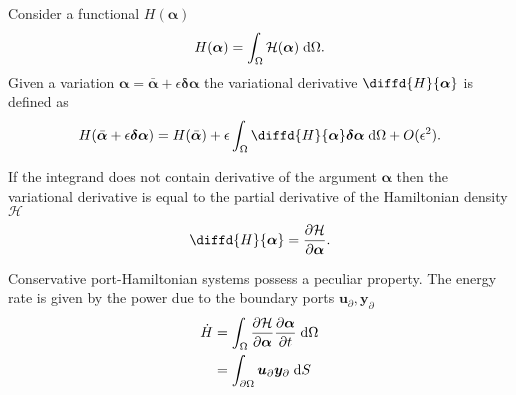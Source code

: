 \begin{definition}
Consider a functional $H(\bm{\alpha})$
\[ H(\bm{\alpha}) = \int_{\Omega} \mathcal{H}(\bm{\alpha}) \d{\Omega}.
\]
Given a variation $\bm{\alpha} = \bar{\bm{\alpha}} + \epsilon \bm{\delta\alpha}$ the variational derivative $\diffd{H}{\bm{\alpha}}$ is defined as
\[
H(\bar{\bm{\alpha}} + \epsilon \bm{\delta\alpha}) = H(\bar{\bm{\alpha}}) + \epsilon \int_{\Omega} \diffd{H}{\bm{\alpha}} \bm{\delta\alpha} \d{\Omega} + O(\epsilon^2).
\]
\end{definition}
\begin{remark}
If the integrand does not contain derivative of the argument $\bm{\alpha}$ then the variational derivative is equal to the partial derivative of the Hamiltonian density $\mathcal{H}$
\[
\diffd{H}{\bm{\alpha}} = \diffp{\mathcal{H}}{\bm{\alpha}}.
\]
\end{remark}
Conservative port-Hamiltonian systems possess a peculiar property. The energy rate is given by the power due to the boundary ports $\bm{u}_\partial, \bm{y}_\partial$
\begin{equation}
\begin{aligned}
\dot{H} &= \int_{\Omega} \diffp{\mathcal{H}}{\bm{\alpha}}  \diffp{\bm{\alpha}}{t} \d{\Omega} \\
&=\int_{\partial \Omega} \bm{u}_\partial \bm{y}_\partial \d{S}
\end{aligned}
\end{equation} 










